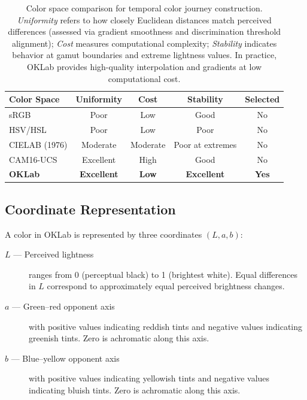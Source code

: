 \begin{table}[htbp]
\centering
\caption{Color space comparison for temporal color journey construction. \textit{Uniformity} refers to how closely Euclidean distances match perceived differences (assessed via gradient smoothness and discrimination threshold alignment); \textit{Cost} measures computational complexity; \textit{Stability} indicates behavior at gamut boundaries and extreme lightness values. In practice, OKLab provides high-quality interpolation and gradients at low computational cost.}
\label{tab:color-space-comparison}
\begin{tabular}{lcccc}
\toprule
\textbf{Color Space} & \textbf{Uniformity} & \textbf{Cost} & \textbf{Stability} & \textbf{Selected} \\
\midrule
sRGB & Poor & Low & Good & No \\
HSV/HSL & Poor & Low & Poor & No \\
CIELAB (1976) & Moderate & Moderate & Poor at extremes & No \\
CAM16-UCS & Excellent & High & Good & No \\
\textbf{OKLab} & \textbf{Excellent} & \textbf{Low} & \textbf{Excellent} & \textbf{Yes} \\
\bottomrule
\end{tabular}
\end{table}

\subsection{Coordinate Representation}

A color in OKLab is represented by three coordinates $(L, a, b)$:

\begin{description}
    \item[$L$ --- Perceived lightness] ranges from 0 (perceptual black) to 1 (brightest white). Equal differences in $L$ correspond to approximately equal perceived brightness changes.
    
    \item[$a$ --- Green–red opponent axis] with positive values indicating reddish tints and negative values indicating greenish tints. Zero is achromatic along this axis.
    
    \item[$b$ --- Blue–yellow opponent axis] with positive values indicating yellowish tints and negative values indicating bluish tints. Zero is achromatic along this axis.
\end{description}

